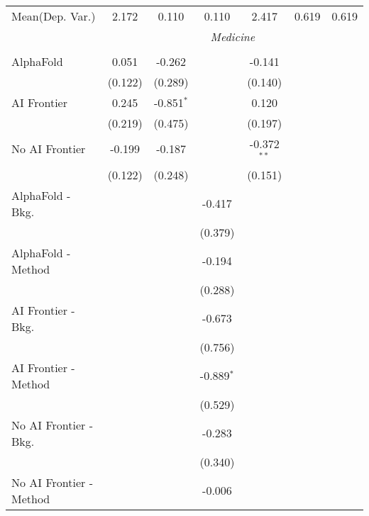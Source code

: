 \begin{tabular}{lcccccc}
Mean(Dep. Var.) & 2.172 & 0.110 & 0.110 & 2.417 & 0.619 & 0.619 \\
 & \multicolumn{6}{c}{\textit{Medicine}} \\ \\
   AlphaFold               & 0.051      & -0.262       &              & -0.141        &       &   \\   
                           & (0.122)    & (0.289)      &              & (0.140)       &       &   \\   
   AI Frontier             & 0.245      & -0.851$^{*}$ &              & 0.120         &       &   \\   
                           & (0.219)    & (0.475)      &              & (0.197)       &       &   \\   
   No AI Frontier          & -0.199     & -0.187       &              & -0.372$^{**}$ &       &   \\   
                           & (0.122)    & (0.248)      &              & (0.151)       &       &   \\   
   AlphaFold - Bkg.        &            &              & -0.417       &               &       &   \\   
                           &            &              & (0.379)      &               &       &   \\   
   AlphaFold - Method      &            &              & -0.194       &               &       &   \\   
                           &            &              & (0.288)      &               &       &   \\   
   AI Frontier - Bkg.      &            &              & -0.673       &               &       &   \\   
                           &            &              & (0.756)      &               &       &   \\   
   AI Frontier - Method    &            &              & -0.889$^{*}$ &               &       &   \\   
                           &            &              & (0.529)      &               &       &   \\   
   No AI Frontier - Bkg.   &            &              & -0.283       &               &       &   \\   
                           &            &              & (0.340)      &               &       &   \\   
   No AI Frontier - Method &            &              & -0.006       &               &       &   \\   

\end{tabular}
